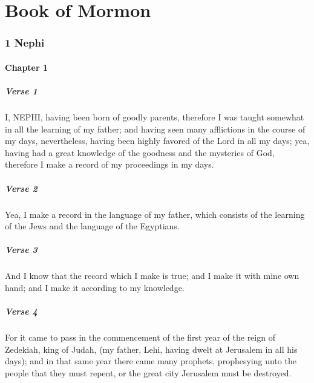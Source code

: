 \part{Book of Mormon}

\section{1 Nephi}

	\subsection{Chapter 1}
	
		\subsubsection{Verse 1}  I, NEPHI, having been born of goodly parents, therefore I was taught somewhat in all the learning of my father; and having seen many afflictions in the course of my days, nevertheless, having been highly favored of the Lord in all my days; yea, having had a great knowledge of the goodness and the mysteries of God, therefore I make a record of my proceedings in my days.
		\subsubsection{Verse 2}  Yea, I make a record in the language of my father, which consists of the learning of the Jews and the language of the Egyptians.
		\subsubsection{Verse 3}  And I know that the record which I make is true; and I make it with mine own hand; and I make it according to my knowledge.
		\subsubsection{Verse 4}  For it came to pass in the commencement of the first year of the reign of Zedekiah, king of Judah, (my father, Lehi, having dwelt at Jerusalem in all his days); and in that same year there came many prophets, prophesying unto the people that they must repent, or the great city Jerusalem must be destroyed.
